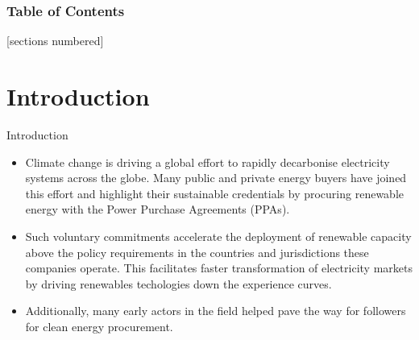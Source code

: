 \begin{frame}

  \frametitle{Table of Contents}
  [sections numbered]
  \tableofcontents[hideallsubsections]
\end{frame}



\section{Introduction}


\begin{frame}{Introduction}

  \centering
    \begin{itemize}
    \item Climate change is driving a global effort to rapidly decarbonise 
    electricity systems across the globe. 
    Many public and private energy buyers have joined this effort and highlight
    their sustainable credentials by procuring renewable energy with the 
    Power Purchase Agreements (PPAs).
    \item Such \alert{voluntary commitments accelerate the deployment of renewable 
    capacity} above the policy requirements in the countries and jurisdictions
    these companies operate. This facilitates faster
    transformation of electricity markets by driving renewables
    techologies down the experience curves.
    \item Additionally, many early actors in the field helped pave the way for followers 
     for clean energy procurement.
    \end{itemize}
  
\end{frame}



